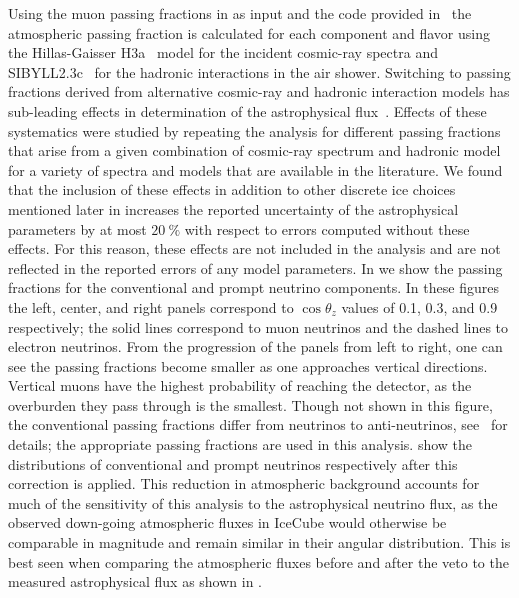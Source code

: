 Using the muon passing fractions in  as input and the \nuveto{} code provided in~\cite{Arguelles:2018awr} the atmospheric passing fraction is calculated for each component and flavor using the Hillas-Gaisser H3a~\cite{Gaisser:2013bla,Gaisser:2011cc,Hillas:2006ms} model for the incident cosmic-ray spectra and SIBYLL2.3c~\cite{Riehn:2017mfm} for the hadronic interactions in the air shower.
Switching to passing fractions derived from alternative cosmic-ray and hadronic interaction models has sub-leading effects in determination of the astrophysical flux~\cite{Arguelles:2018awr}.
Effects of these systematics were studied by repeating the analysis for different passing fractions that arise from a given combination of cosmic-ray spectrum and hadronic model for a variety of spectra and models that are available in the literature.
We found that the inclusion of these effects in addition to other discrete ice choices mentioned later in  increases the reported uncertainty of the astrophysical parameters by at most $\SI{20}\percent$ with respect to errors computed without these effects.
For this reason, these effects are not included in the analysis and are not reflected in the reported errors of any model parameters.
In  we show the passing fractions for the conventional and prompt neutrino components.
In these figures the left, center, and right panels correspond to $\cos\theta_z$ values of 0.1, 0.3, and 0.9 respectively; the solid lines correspond to muon neutrinos and the dashed lines to electron neutrinos.
From the progression of the panels from left to right, one can see the passing fractions become smaller as one approaches vertical directions.
Vertical muons have the highest probability of reaching the detector, as the overburden they pass through is the smallest.
Though not shown in this figure, the conventional passing fractions differ from neutrinos to anti-neutrinos, see~\cite{Arguelles:2018awr} for details; the appropriate passing fractions are used in this analysis.
 show the distributions of conventional and prompt neutrinos respectively after this correction is applied.
This reduction in atmospheric background accounts for much of the sensitivity of this analysis to the astrophysical neutrino flux, as the observed down-going atmospheric fluxes in IceCube would otherwise be comparable in magnitude and remain similar in their angular distribution.
This is best seen when comparing the atmospheric fluxes before and after the veto to the measured astrophysical flux as shown in .

